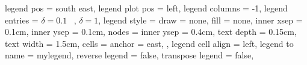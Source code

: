	legend pos				= south east, %
	legend plot pos			= left, %
	legend columns			= -1, %
	legend entries			= {$\delta = 0.1 \;\;\;$, $\delta = 1$},
	legend style			=
	{
		draw				= none,
		fill				= none,
		inner xsep			= 0.1cm,
		inner ysep			= 0.1cm,
		nodes				= {inner ysep = 0.4cm, text depth = 0.15cm, text width = 1.5cm},
		cells				= {anchor = east},
	},
	legend cell align		= left, %
	legend to name			= mylegend,
	reverse legend			= false, %
	transpose legend		= false, %
